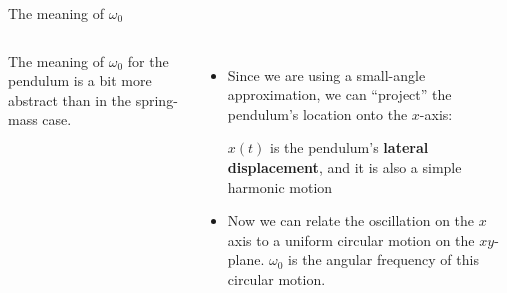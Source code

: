 \documentclass[12pt,compress,aspectratio=169]{beamer}
\begin{document}
\begin{frame}{The meaning of $\omega_0$}
\begin{columns}
    The meaning of $\omega_0$ for the pendulum is a bit more abstract than in
    the spring-mass case.
    \begin{itemize}
    \item Since we are using a small-angle approximation, we can ``project'' the
      pendulum's location onto the $x$-axis:


      \vspace{-.05in}$x(t)$ is the pendulum's \textbf{lateral displacement},
      and it is also a simple harmonic motion
      
    \item Now we can relate the oscillation on the $x$ axis to a uniform
      circular motion on the $xy$-plane. $\omega_0$ is the angular frequency
      of this circular motion.
    \end{itemize}
  \end{columns}
\end{frame}
\end{document}

